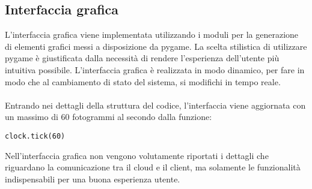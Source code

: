 \subsection{Interfaccia grafica}
L'interfaccia grafica viene implementata utilizzando i moduli per la generazione di elementi grafici messi a disposizione da pygame.
La scelta stilistica di utilizzare pygame è giustificata dalla necessità di rendere l'esperienza dell'utente più intuitiva possibile.
L'interfaccia grafica è realizzata in modo dinamico, per fare in modo che al cambiamento di stato del sistema, si modifichi in tempo reale.
\\\\Entrando nei dettagli della struttura del codice, l'interfaccia viene aggiornata con un massimo di 60 fotogrammi al secondo dalla funzione:
\begin{verbatim}
clock.tick(60)
\end{verbatim}
Nell'interfaccia grafica non vengono volutamente riportati i dettagli che riguardano la comunicazione tra il cloud e il client, ma solamente le funzionalità
indispensabili per una buona esperienza utente. 



















